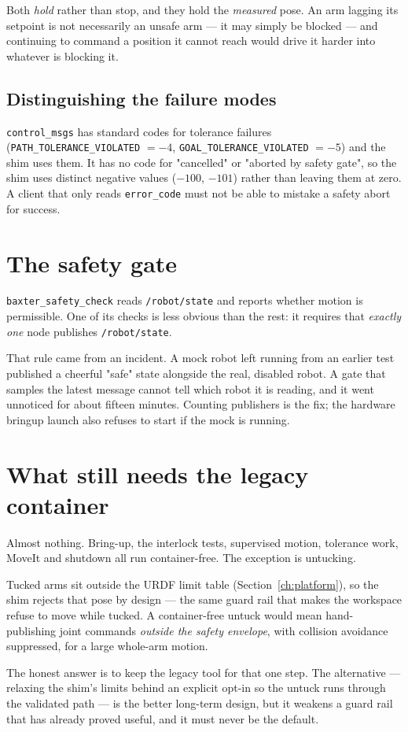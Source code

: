 Both \emph{hold} rather than stop, and they hold the \emph{measured} pose. An arm
lagging its setpoint is not necessarily an unsafe arm --- it may simply be blocked
--- and continuing to command a position it cannot reach would drive it harder
into whatever is blocking it.

\subsection{Distinguishing the failure modes}

\texttt{control\_msgs} has standard codes for tolerance failures
(\texttt{PATH\_TOLERANCE\_VIOLATED} $=-4$, \texttt{GOAL\_TOLERANCE\_VIOLATED}
$=-5$) and the shim uses them. It has no code for "cancelled" or "aborted by
safety gate", so the shim uses distinct negative values ($-100$, $-101$) rather
than leaving them at zero. A client that only reads \texttt{error\_code} must not
be able to mistake a safety abort for success.

\section{The safety gate}

\texttt{baxter\_safety\_check} reads \texttt{/robot/state} and reports whether
motion is permissible. One of its checks is less obvious than the rest: it
requires that \emph{exactly one} node publishes \texttt{/robot/state}.

That rule came from an incident. A mock robot left running from an earlier test
published a cheerful "safe" state alongside the real, disabled robot. A gate that
samples the latest message cannot tell which robot it is reading, and it went
unnoticed for about fifteen minutes. Counting publishers is the fix; the
hardware bringup launch also refuses to start if the mock is running.

\section{What still needs the legacy container}

Almost nothing. Bring-up, the interlock tests, supervised motion, tolerance work,
MoveIt and shutdown all run container-free. The exception is untucking.

Tucked arms sit outside the URDF limit table
(Section~\ref{ch:platform}), so the shim rejects that pose by design --- the same
guard rail that makes the workspace refuse to move while tucked. A container-free
untuck would mean hand-publishing joint commands \emph{outside the safety
envelope}, with collision avoidance suppressed, for a large whole-arm motion.

The honest answer is to keep the legacy tool for that one step. The alternative
--- relaxing the shim's limits behind an explicit opt-in so the untuck runs through
the validated path --- is the better long-term design, but it weakens a guard rail
that has already proved useful, and it must never be the default.
